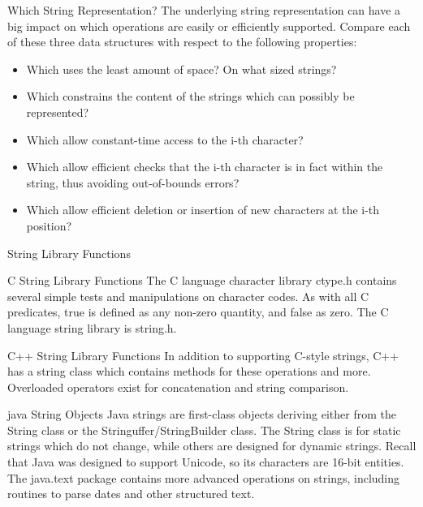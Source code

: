 \documentclass{beamer}
\begin{document}
\begin{frame}{Which String Representation?}
The underlying string representation can have a big impact
on which operations are easily or efficiently supported.
Compare each of these three data structures with respect to
the following properties:

\begin{itemize}
\item Which uses the least amount of space? On what sized strings?
\item Which constrains the content of the strings which can possibly be represented?
\item Which allow constant-time access to the i-th character?
\item Which allow efficient checks that the i-th character is in fact within the string, thus avoiding out-of-bounds errors?
\item Which allow efficient deletion or insertion of new characters at the i-th position?
\end{itemize}

\end{frame}


\begin{frame}{String Library Functions}

  \begin{block}{C String Library Functions}
    The C language character library ctype.h contains several simple tests and manipulations on character codes.
    As with all C predicates, true is defined as any non-zero quantity, and false as zero.
    The C language string library is string.h.
  \end{block}

\begin{block}{C++ String Library Functions}
In addition to supporting C-style strings, C++ has a string class which contains methods for these operations and more. Overloaded operators exist for concatenation and string comparison.
\end{block}


\begin{block}{java String Objects}
  Java strings are first-class objects deriving either from the String class or the Stringuffer/StringBuilder class.
  The String class is for static strings which do not change, while others are designed for dynamic strings.
  Recall that Java was designed to support Unicode, so its characters are 16-bit entities.
  The java.text package contains more advanced operations on strings, including routines to parse dates and other structured text.
\end{block}

\end{frame}
\end{document}

